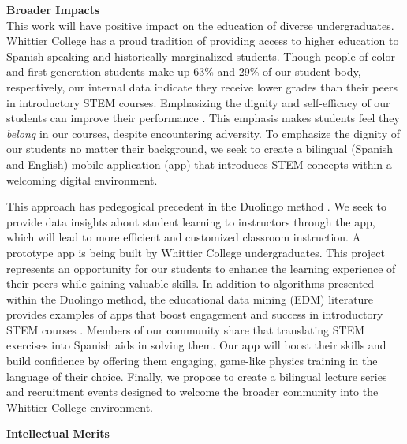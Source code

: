 \documentclass[11pt]{amsart}
\begin{document}
\noindent \textbf{Broader Impacts} \\ \noindent This work will have positive impact on the education of diverse undergraduates.  Whittier College has a proud tradition of providing access to higher education to Spanish-speaking and historically marginalized students.  Though people of color and first-generation students make up 63\% and 29\% of our student body, respectively, our internal data indicate they receive lower grades than their peers in introductory STEM courses. Emphasizing the dignity and self-efficacy of our students can improve their performance \cite{cottrell1,cottrell2}.  This emphasis makes students feel they \textit{belong} in our courses, despite encountering adversity.  To emphasize the dignity of our students no matter their background, we seek to create a bilingual (Spanish and English) mobile application (app) that introduces STEM concepts within a welcoming digital environment.

This approach has pedegogical precedent in the Duolingo method \cite{duolingo_whitepaper}. We seek to provide data insights about student learning to instructors through the app, which will lead to more efficient and customized classroom instruction.  A prototype app is being built by Whittier College undergraduates.  This project represents an opportunity for our students to enhance the learning experience of their peers while gaining valuable skills.  In addition to algorithms presented within the Duolingo method, the educational data mining (EDM) literature provides examples of apps that boost engagement and success in introductory STEM courses \cite{edm1,edm2,edm3,edm4}.  Members of our community share that translating STEM exercises into Spanish aids in solving them.  Our app will boost their skills and build confidence by offering them engaging, game-like physics training in the language of their choice.  Finally, we propose to create a bilingual lecture series and recruitment events designed to welcome the broader community into the Whittier College environment.

\clearpage

\centerline{\bf \Large Intellectual Merits}
\setcounter{section}{0}
\linespacing

\label{sec:top}
\end{document}

